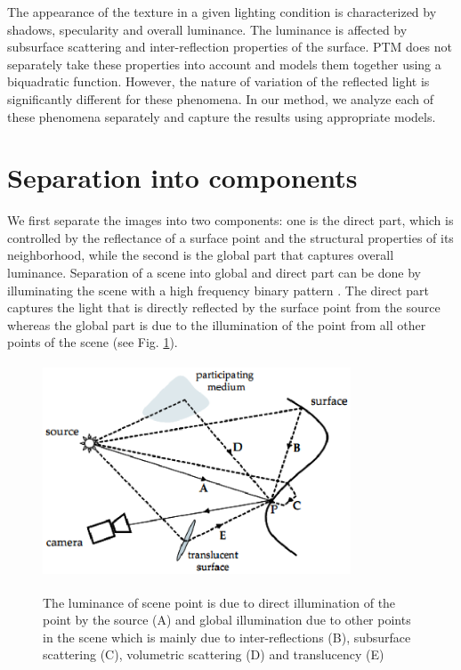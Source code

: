 The appearance of the texture in a given lighting condition is characterized by
shadows, specularity and overall luminance. The luminance is affected by
subsurface scattering and inter-reflection properties of the surface. PTM does
not separately take these properties into account and models them together using
a biquadratic function. However, the nature of variation of the reflected light
is significantly different for these phenomena.
In our method, we analyze each of these phenomena separately and capture the
results using appropriate models. 
\section{Separation into components}
We first separate the images into two components: one is the direct part, which is controlled by the reflectance of a
surface point and the structural properties of its neighborhood, while the
second is the global part that captures overall luminance. 
Separation of a scene into global and direct part can be done by illuminating the scene with a high
frequency binary pattern \cite{B4}. The direct part captures the light that is
directly reflected by the surface point from the source whereas the global part
is due to the illumination of the point from all other points of the scene (see Fig. \ref{fig:15}).

\begin{figure}[t]
\centering
\includegraphics[height=2.5in,width=3.6in]{sep_images/sep2.eps}
\label{fig:15} \caption{The luminance of scene point is due to direct illumination
of the point by the source (A) and global illumination due to other
points in the scene which is mainly due to inter-reflections (B), subsurface scattering (C), volumetric scattering (D)
and translucency (E) 
}
\end{figure}

